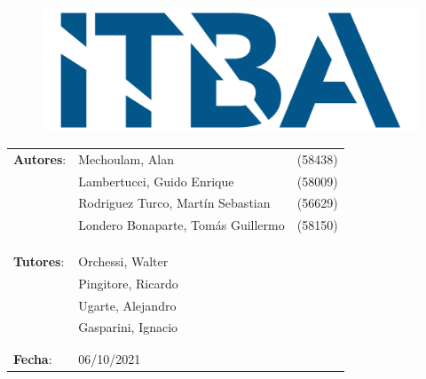 \begin{titlepage}
\begin{figure}[H]
	\centering
	\includegraphics[width=0.5\linewidth]{./Utils/ITBA_2}
\end{figure}

\vspace*{1.5cm}

\center
{  }

\vspace*{1cm}

{ \textcolor{PName}{} }

\vspace*{3cm}

\begin{tabular}{llr} 	
\textbf{Autores}: & Mechoulam, Alan  &  (58438)\\
 & Lambertucci, Guido Enrique  & (58009) \\
 & Rodriguez Turco, Martín Sebastian  & (56629) \\
 & Londero Bonaparte, Tomás Guillermo  & (58150) \\
 &  & \\
 &  & \\
 &  & \\
\textbf{Tutores}: & Orchessi, Walter & \hspace*{4cm} \\
 & Pingitore, Ricardo & \hspace*{4cm} \\
 & Ugarte, Alejandro & \hspace*{4cm} \\
 & Gasparini, Ignacio & \hspace*{4cm} \\
 &  & \\
 &  & \\
\textbf{Fecha}: & 06/10/2021 & \hspace*{4.5cm}\\
\end{tabular}

\end{titlepage}